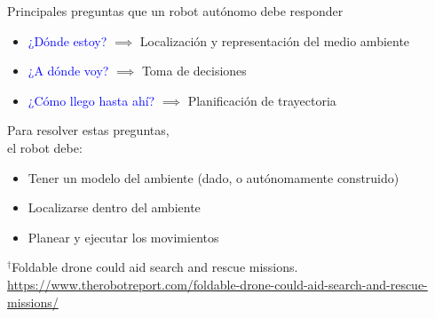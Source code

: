 \documentclass[
  24pt, %
  aspectratio=169, %
]{beamer}
\begin{document}
\begin{frame}  
  Principales preguntas que un robot autónomo debe responder \footnotemark
  \bigskip %
  \begin{itemize}
  \item \textcolor{blue}{¿Dónde estoy?} $\implies$ Localización y representación del medio ambiente \pause 
  \item \textcolor{blue}{¿A dónde voy?} $\implies$ Toma de decisiones \pause  %
  \item \textcolor{blue}{¿Cómo llego hasta ahí?} $\implies$ Planificación de trayectoria 
  \end{itemize}
  \pause
  \bigskip %

  \begin{minipage}{0.47\textwidth}
    Para resolver estas preguntas,\\
    el robot debe: 
    
    \begin{itemize}
    \item Tener un modelo del ambiente (dado, o autónomamente construido)
    \item Localizarse dentro del ambiente
    \item Planear y ejecutar los movimientos
    \end{itemize}
    
  \end{minipage}
  \hspace{0.2cm}
  \begin{minipage}{0.5\textwidth}
    \centering
    \rule{0in}{1.2em}$^\dag$\scriptsize Foldable drone could aid search and rescue missions.\\
    \tiny \url{https://www.therobotreport.com/foldable-drone-could-aid-search-and-rescue-missions/} 
  \end{minipage}
\end{frame}
\end{document}
